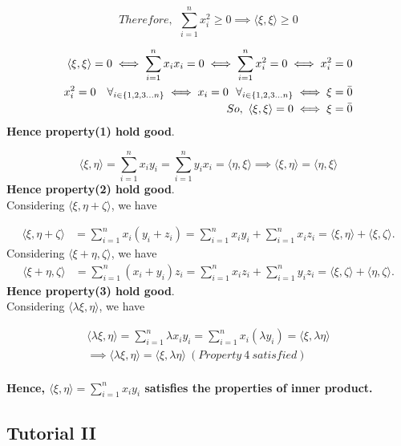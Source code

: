 \documentclass{article}
\begin{document}
 $$Therefore,~~\sum_{i=1}^{n} x_{i}^{2} \geq 0 \implies \langle\xi, \xi\rangle \geq 0$$

$$
\begin{aligned}
\langle\xi, \xi\rangle=0 \iff \sum_{i=1}^{n} x_{i} x_{i}=0 \iff \sum_{i=1}^{n} x_{i}^{2}=0 \iff x_{i}^{2}=0\\
x_{i}^{2}=0~~~ \forall_{i \in \{1,2,3...n\}} \iff x_i=0~~ \forall_{i \in \{1,2,3...n\}} \iff \xi=\Bar{0}\\
So,~ \langle\xi, \xi\rangle=0 \iff \xi=\Bar{0} 
\end{aligned}
$$
\textbf{Hence property(1) hold good}.

$$
\langle\xi, \eta\rangle=\sum_{i=1}^{n} x_{i} y_{i}=\sum_{i=1}^{n} y_{i} x_{i}=\langle\eta, \xi\rangle \implies \langle\xi, \eta\rangle=\langle\eta, \xi\rangle$$
\textbf{Hence property(2) hold good}.\\
\newpage
Considering $\langle\xi, \eta+\zeta\rangle$, we have

$$
\begin{aligned}
\langle\xi, \eta+\zeta\rangle & =\sum_{i=1}^{n} x_{i}\left(y_{i}+z_{i}\right)=\sum_{i=1}^{n} x_{i} y_{i}+\sum_{i=1}^{n} x_{i} z_{i} =\langle\xi, \eta\rangle+\langle\xi, \zeta\rangle .
\end{aligned}
$$
Considering $\langle\xi+\eta, \zeta\rangle$, we have
$$
\begin{aligned}
\langle\xi+\eta, \zeta\rangle & =\sum_{i=1}^{n}\left(x_{i}+y_{i}\right) z_{i}=\sum_{i=1}^{n} x_{i} z_{i}+\sum_{i=1}^{n} y_{i} z_{i}  =\langle\xi, \zeta\rangle+\langle\eta, \zeta\rangle .
\end{aligned}
$$
\textbf{Hence property(3) hold good}.\\

Considering $\langle\lambda \xi, \eta\rangle$, we have

$$
\begin{align}
\langle\lambda \xi, \eta\rangle=\sum_{i=1}^{n} \lambda x_{i} y_{i}=\sum_{i=1}^{n} x_{i}\left(\lambda y_{i}\right)=\langle\xi, \lambda \eta\rangle\\
\implies \langle\lambda \xi, \eta\rangle=\langle\xi, \lambda \eta\rangle ~(Property ~ 4~satisfied)
\end{align}
$$\\

\textbf{Hence, $\langle\xi, \eta\rangle=\sum_{i=1}^{n} x_{i} y_{i}$ satisfies the properties of inner product.}\\

\subsection{Tutorial II}
\end{document}
